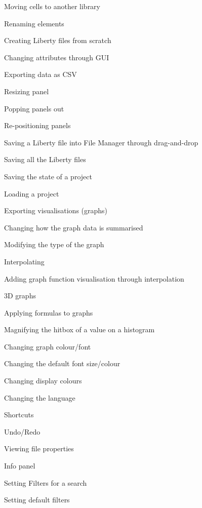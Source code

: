 \documentclass[10pt,a4paper]{report}
\begin{document}
\begin{FRO}
    \item Moving cells to another library \label{FRO-1}
    \item Renaming elements \label{FRO-2}
    \item Creating Liberty files from scratch \label{FRO-3}
    \item Changing attributes through GUI \label{FRO-4}
    \item Exporting data as CSV \label{FRO-5}
    \item Resizing panel \label{FRO-xy}
    \item Popping panels out \label{FRO-xyz}
    \item Re-positioning panels \label{FRO-xyzt}
    \item Saving a Liberty file into File Manager through drag-and-drop \label{FRO-6}
    \item Saving all the Liberty files \label{FRO-7.5} %
    \item Saving the state of a project \label{FRO-7}
    \item Loading a project \label{FRO-8}
    \item Exporting visualisations (graphs) \label{FRO-9}
    \item Changing how the graph data is summarised \label{FRO-10}
    \item Modifying the type of the graph \label{FRO-11}
    \item Interpolating \label{FR-(x1-x)/(y1-y)}
    \item Adding graph function visualisation through interpolation \label{FR-NaN}
    \item 3D graphs \label{FR-3D}
    \item Applying formulas to graphs \label{FRO-12}
    \item Magnifying the hitbox of a value on a histogram \label{FRO-13}
    \item Changing graph colour/font \label{FRO-14}
    \item Changing the default font size/colour \label{FRO-15}
    \item Changing display colours \label{FRO-16}
    \item Changing the language \label{FRO-17}
    \item Shortcuts \label{FRO-18}
    \item Undo/Redo \label{FRO-19}
    \item Viewing file properties \label{FRO-20}
    \item Info panel \label{20.5} %
    \item Setting Filters for a search \label{FRO-22}
    \item Setting default filters\label{FRO-23}
\end{FRO}
\end{document}
